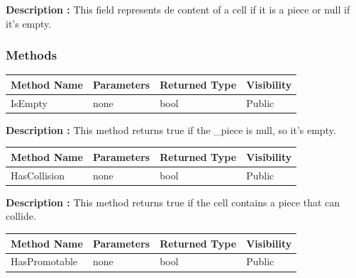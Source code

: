 \documentclass[12pt]{article}
\begin{document}
\textbf{Description :} This field represents de content of a cell if it is a piece
or null if it's empty.

\subsubsection{Methods}

\begin{table}[H]
    \begin{tabular}{|l|l|l|l|}
    \hline
    \rowcolor[HTML]{EFEFEF} 
    \cellcolor[HTML]{EFEFEF}\textbf{Method Name} & \textbf{Parameters}    & \textbf{Returned Type} & \textbf{Visibility} \\ \hline
    IsEmpty                                      & none                   & bool                   & Public              \\ \hline
    \end{tabular}
\end{table}

\textbf{Description :} This method returns true if the \_piece is null, so it's empty.

\begin{table}[H]
    \begin{tabular}{|l|l|l|l|}
    \hline
    \rowcolor[HTML]{EFEFEF} 
    \cellcolor[HTML]{EFEFEF}\textbf{Method Name} & \textbf{Parameters}     & \textbf{Returned Type} & \textbf{Visibility} \\ \hline
    HasCollision                                 & none                    & bool                   & Public              \\ \hline
    \end{tabular}
\end{table}

\textbf{Description :} This method returns true if the cell contains a piece that can collide.

\begin{table}[H]
    \begin{tabular}{|l|l|l|l|}
    \hline
    \rowcolor[HTML]{EFEFEF} 
    \cellcolor[HTML]{EFEFEF}\textbf{Method Name} & \textbf{Parameters}     & \textbf{Returned Type} & \textbf{Visibility} \\ \hline
    HasPromotable                                & none                    & bool                   & Public              \\ \hline
    \end{tabular}
\end{table}
\end{document}
